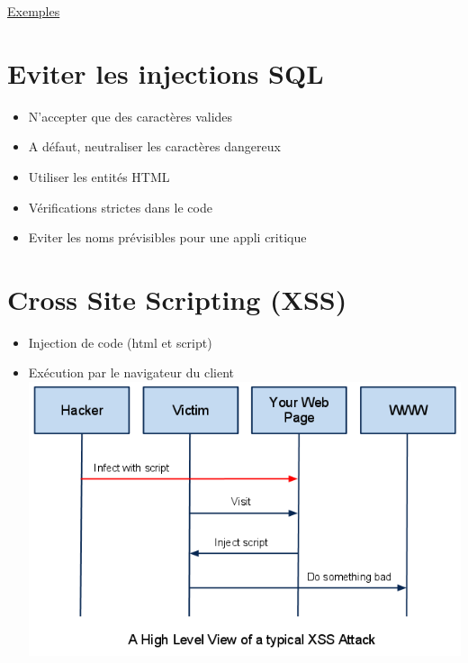 \href{https://fr.wikipedia.org/wiki/Injection_SQL}{Exemples}

\begin{english}

\begin{Shaded}
\begin{Highlighting}[]
\OperatorTok{=} 
   
\end{Highlighting}
\end{Shaded}

\end{english}

\hypertarget{eviter-les-injections-sql}{%
\section{Eviter les injections SQL}\label{eviter-les-injections-sql}}

\begin{itemize}
\tightlist
\item
  N'accepter que des caractères valides
\item
  A défaut, neutraliser les caractères dangereux
\item
  Utiliser les entités HTML
\item
  Vérifications strictes dans le code
\item
  Eviter les noms prévisibles pour une appli critique
\end{itemize}

\hypertarget{cross-site-scripting-xss}{%
\section{Cross Site Scripting (XSS)}\label{cross-site-scripting-xss}}

\begin{itemize}
\tightlist
\item
  Injection de code (html et script)
\item
  Exécution par le navigateur du client
  \includegraphics{src/img/xss.png}
\end{itemize}

